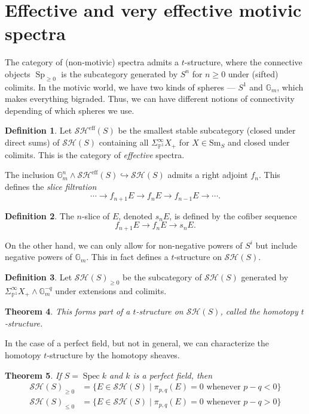 \documentclass{shortart}
\newtheorem{thm}{Theorem}[section]
\theoremstyle{definition}
\newtheorem{defi}[thm]{Definition}
\newcommand\Sm{\mathrm{Sm}}
\newcommand\SH{\mathcal{SH}}
\renewcommand\P{\mathbb{P}}
\newcommand\G{\mathbb{G}}
\newcommand\eff{\mathrm{eff}}
\DeclareMathOperator\Sp{Sp}
\DeclareMathOperator\Spec{Spec}
\begin{document}
\section{Effective and very effective motivic spectra}\label{chapter:effective}
The category of (non-motivic) spectra admits a $t$-structure, where the connective objects $\Sp_{\geq 0}$ is the subcategory generated by $S^n$ for $n \geq 0$ under (sifted) colimits. In the motivic world, we have two kinds of spheres --- $S^1$ and $\G_m$, which makes everything bigraded. Thus, we can have different notions of connectivity depending of which spheres we use.

\begin{defi}
  Let $\SH^{\eff}(S)$ be the smallest stable subcategory (closed under direct sums) of $\SH(S)$ containing all $\Sigma^\infty_{\P^1} X_+$ for $X \in \Sm_S$ and closed under colimits. This is the category of \emph{effective} spectra.
\end{defi}

The inclusion $\G_m^n \wedge \SH^{\eff}(S) \hookrightarrow \SH(S)$ admits a right adjoint $f_n$. This defines the \emph{slice filtration}
\[
  \cdots \to f_{n + 1} E \to f_n E \to f_{n - 1} E \to \cdots.
\]

\begin{defi}
  The $n$-slice of $E$, denoted $s_n E$, is defined by the cofiber sequence
  \[
    f_{n + 1} E \to f_n E \to s_n E.
  \]
\end{defi}

On the other hand, we can only allow for non-negative powers of $S^i$ but include negative powers of $\G_m$. This in fact defines a $t$-structure on $\SH(S)$.

\begin{defi}
  Let $\SH(S)_{\geq 0}$ be the subcategory of $\SH(S)$ generated by $\Sigma^\infty_{\P^1} X_+ \wedge \G_m^{-q}$ under extensions and colimits.
\end{defi}

\begin{thm}
  This forms part of a $t$-structure on $\SH(S)$, called the \emph{homotopy $t$-structure}.
\end{thm}

In the case of a perfect field, but not in general, we can characterize the homotopy $t$-structure by the homotopy sheaves.
\begin{thm}
  If $S = \Spec k$ and $k$ is a perfect field, then
  \[
    \begin{aligned}
      \SH(S)_{\geq 0} &= \{ E \in \SH(S) \mid \pi_{p, q}(E) = 0\text{ whenever }p - q < 0\}\\
      \SH(S)_{\leq 0} &= \{ E \in \SH(S) \mid \pi_{p, q}(E) = 0\text{ whenever }p - q> 0\}
    \end{aligned}
  \]
\end{thm}
\end{document}
